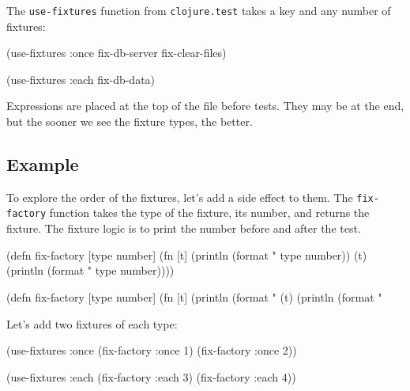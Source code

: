 The \verb|use-fixtures| function from \verb|clojure.test| takes a key and any number of fixtures:


\begin{english}
  \begin{clojure}
(use-fixtures :once
  fix-db-server fix-clear-files)

(use-fixtures :each fix-db-data)
  \end{clojure}
\end{english}

Expressions are placed at the top of the file before tests. They may be at the end, but the sooner we see the fixture types, the better.

\subsection{Example}

To explore the order of the fixtures, let's add a side effect to them. The \verb|fix-factory| function takes the type of the fixture, its number, and returns the fixture. The fixture logic is to print the number before and after the test.


\ifx\DEVICETYPE\MOBILE

\begin{english}
  \begin{clojure}
(defn fix-factory [type number]
  (fn [t]
    (println (format "%
               type number))
    (t)
    (println (format "%
               type number))))
  \end{clojure}
\end{english}

\else

\begin{english}
  \begin{clojure}
(defn fix-factory [type number]
  (fn [t]
    (println (format "%
    (t)
    (println (format "%
  \end{clojure}
\end{english}

\fi

\noindent
Let's add two fixtures of each type:

\begin{english}
  \begin{clojure}
(use-fixtures :once
  (fix-factory :once 1)
  (fix-factory :once 2))

(use-fixtures :each
  (fix-factory :each 3)
  (fix-factory :each 4))
  \end{clojure}
\end{english}

